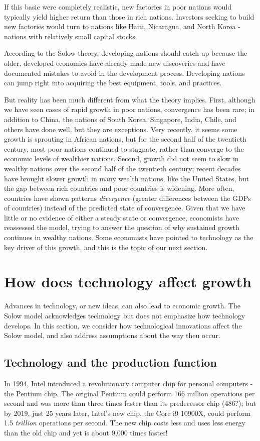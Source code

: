 \documentclass[11pt]{article} %
\begin{document}
If this basic were completely realistic, new factories in poor nations would typically yield higher return than those in rich nations. Investors seeking to build new factories would turn to nations like Haiti, Nicaragua, and North Korea - nations with relatively small capital stocks.

According to the Solow theory, developing nations should catch up because the older, developed economics have already made new discoveries and have documented mistakes to avoid in the development process. Developing nations can jump right into acquiring the best equipment, tools, and practices.

But reality has been much different from what the theory implies. First, although we have seen cases of rapid growth in poor nations, convergence has been rare; in addition to China, the nations of South Korea, Singapore, India, Chile, and others have done well, but they are exceptions. Very recently, it seems some growth is sprouting in African nations, but for the second half of the twentieth century, most poor nations continued to stagnate, rather than converge to the economic levels of wealthier nations. Second, growth did not seem to slow in wealthy nations over the second half of the twentieth century; recent decades have brought slower growth in many wealth nations, like the United States, but the gap between rich countries and poor countries is widening. More often, countries have shown patterns \textit{divergence} (greater differences between the GDPs of countries) instead of the predicted state of convergence. Given that we have little or no evidence of either a steady state or convergence, economists have reassessed the model, trying to answer the question of why sustained growth continues in wealthy nations. Some economists have pointed to technology as the key driver of this growth, and this is the topic of our next section.

\section*{\textbf{How does technology affect growth}}
Advances in technology, or new ideas, can also lead to economic growth. The Solow model acknowledges technology but does not emphasize how technology develops. In this section, we consider how technological innovations affect the Solow model, and also address assumptions about the way theu occur.

\subsection*{Technology and the production function}
In 1994, Intel introduced a revolutionary computer chip for personal computers - the Pentium chip. The original Pentium could perform 166 million operations per second and was more than three times faster than its predecessor chip (486?); but by 2019, just 25 years later, Intel's new chip, the Core i9 10900X, could perform 1.5 \textit{trillion} operations per second. The new chip costs less and uses less energy than the old chip and yet is about 9,000 times faster!
\end{document}

